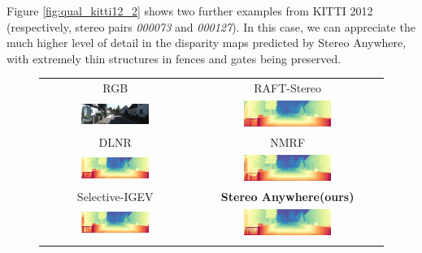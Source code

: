 \documentclass[10pt,twocolumn,letterpaper]{article}
\newcommand{\method}[0]{Stereo Anywhere\xspace}
\begin{document}
\clearpage

Figure \ref{fig:qual_kitti12_2} shows two further examples from KITTI 2012 (respectively, stereo pairs \textit{000073} and \textit{000127}). In this case, we can appreciate the much higher level of detail in the disparity maps predicted by \method, with extremely thin structures in fences and gates being preserved.

\begin{figure}[h]
    \centering
    \renewcommand{\tabcolsep}{1pt}
    \begin{tabular}{cc}
        \small RGB &
        \small RAFT-Stereo \cite{lipson2021raft} \\
        \includegraphics[width=0.48\textwidth]{imgs/KITTI12/rgb/73.jpg} &
        \includegraphics[width=0.48\textwidth]{imgs/KITTI12/stereo/RAFT-Stereo/73.jpg} \\
        \small DLNR \cite{zhao2023high} &
        \small NMRF \cite{guan2024neural} \\
        \includegraphics[width=0.48\textwidth]{imgs/KITTI12/stereo/DLNR/73.jpg} &
        \includegraphics[width=0.48\textwidth]{imgs/KITTI12/stereo/NMRF/73.jpg} \\
        \small Selective-IGEV \cite{wang2024selective} &
        \textbf{\method (ours)} \\
        \includegraphics[width=0.48\textwidth]{imgs/KITTI12/stereo/Selective/73.jpg} &
        \includegraphics[width=0.48\textwidth]{imgs/KITTI12/stereo/Ours/73.jpg} \\ \\


\end{tabular}
\end{figure}
\end{document}
